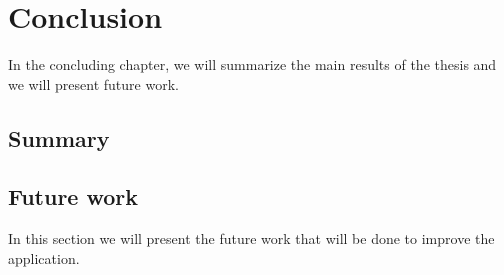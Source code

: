 
\chapter{Conclusion}\label{cap:conclusion}
In the concluding chapter, we will summarize the main results of the thesis and we will present future work.
\section{Summary}
\section{Future work}
In this section we will present the future work that will be done to improve the application.
